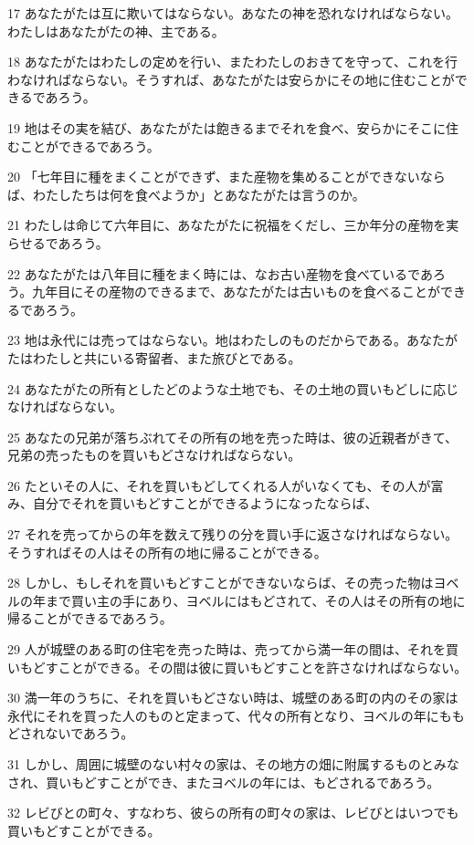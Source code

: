 \par 17 あなたがたは互に欺いてはならない。あなたの神を恐れなければならない。わたしはあなたがたの神、主である。
\par 18 あなたがたはわたしの定めを行い、またわたしのおきてを守って、これを行わなければならない。そうすれば、あなたがたは安らかにその地に住むことができるであろう。
\par 19 地はその実を結び、あなたがたは飽きるまでそれを食べ、安らかにそこに住むことができるであろう。
\par 20 「七年目に種をまくことができず、また産物を集めることができないならば、わたしたちは何を食べようか」とあなたがたは言うのか。
\par 21 わたしは命じて六年目に、あなたがたに祝福をくだし、三か年分の産物を実らせるであろう。
\par 22 あなたがたは八年目に種をまく時には、なお古い産物を食べているであろう。九年目にその産物のできるまで、あなたがたは古いものを食べることができるであろう。
\par 23 地は永代には売ってはならない。地はわたしのものだからである。あなたがたはわたしと共にいる寄留者、また旅びとである。
\par 24 あなたがたの所有としたどのような土地でも、その土地の買いもどしに応じなければならない。
\par 25 あなたの兄弟が落ちぶれてその所有の地を売った時は、彼の近親者がきて、兄弟の売ったものを買いもどさなければならない。
\par 26 たといその人に、それを買いもどしてくれる人がいなくても、その人が富み、自分でそれを買いもどすことができるようになったならば、
\par 27 それを売ってからの年を数えて残りの分を買い手に返さなければならない。そうすればその人はその所有の地に帰ることができる。
\par 28 しかし、もしそれを買いもどすことができないならば、その売った物はヨベルの年まで買い主の手にあり、ヨベルにはもどされて、その人はその所有の地に帰ることができるであろう。
\par 29 人が城壁のある町の住宅を売った時は、売ってから満一年の間は、それを買いもどすことができる。その間は彼に買いもどすことを許さなければならない。
\par 30 満一年のうちに、それを買いもどさない時は、城壁のある町の内のその家は永代にそれを買った人のものと定まって、代々の所有となり、ヨベルの年にももどされないであろう。
\par 31 しかし、周囲に城壁のない村々の家は、その地方の畑に附属するものとみなされ、買いもどすことができ、またヨベルの年には、もどされるであろう。
\par 32 レビびとの町々、すなわち、彼らの所有の町々の家は、レビびとはいつでも買いもどすことができる。
